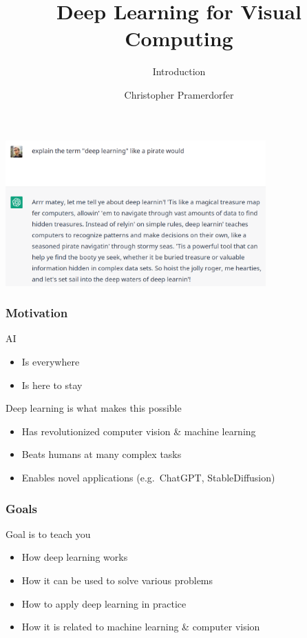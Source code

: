 \documentclass[xetex,professionalfont]{beamer}
\title{Deep Learning for Visual Computing}
\subtitle{Introduction}
\author{Christopher Pramerdorfer}
\institute{Computer Vision Lab, TU Wien}
\renewcommand\emph[1]{\textcolor{tuwcvl_cvl_blue}{#1}}
\begin{document}
\begin{frame}
\maketitle
\end{frame}


{
\begin{frame}


\begin{center}
  \includegraphics[width=10cm]{images/openai}
\end{center}

\end{frame}
}


\begin{frame}
  \frametitle{Motivation}

\emph{AI}
\begin{itemize}
  \item Is everywhere
  \item Is here to stay
\end{itemize}

\bigskip
\emph{Deep learning} is what makes this possible
\begin{itemize}
  \item Has revolutionized computer vision \& machine learning
  \item Beats humans at many complex tasks
  \item Enables novel applications (e.g.~ChatGPT, StableDiffusion)
\end{itemize}

\end{frame}


\begin{frame}
\frametitle{Goals}

Goal is to teach you
\begin{itemize}
    \item How deep learning works
    \item How it can be used to solve various problems
    \item How to apply deep learning in practice
    \item How it is related to machine learning \& computer vision
\end{itemize}

\end{frame}
\end{document}
